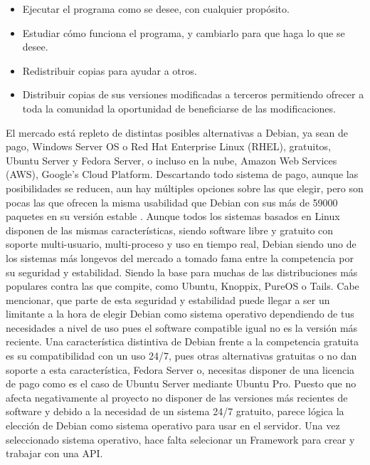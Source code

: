 \begin{itemize}
	\item Ejecutar el programa como se desee, con cualquier propósito.
	\item Estudiar cómo funciona el programa, y cambiarlo para que haga lo que se desee.
	\item Redistribuir copias para ayudar a otros.
	\item Distribuir copias de sus versiones modificadas a terceros permitiendo ofrecer a toda la comunidad la oportunidad de beneficiarse de las modificaciones.
\end{itemize}

El mercado está repleto de distintas posibles alternativas a Debian, ya sean de pago, Windows Server OS o Red Hat Enterprise Linux (RHEL), gratuitos, Ubuntu Server y Fedora Server, o incluso en la nube, Amazon Web Services (AWS), Google’s Cloud Platform. Descartando todo sistema de pago, aunque las posibilidades se reducen, aun hay múltiples opciones sobre las que elegir, pero son pocas las que ofrecen la misma usabilidad que Debian con sus más de 59000 paquetes en su versión estable \cite{DebWhy}.
\newline
\newline
Aunque todos los sistemas basados en Linux disponen de las mismas características, siendo software libre y gratuito con soporte multi-usuario, multi-proceso y uso en tiempo real, Debian siendo uno de los sistemas más longevos del mercado a tomado fama entre la competencia por su seguridad y estabilidad. Siendo la base para muchas de las distribuciones más populares contra las que compite, como Ubuntu, Knoppix, PureOS o Tails.
\newline
\newline
Cabe mencionar, que parte de esta seguridad y estabilidad puede llegar a ser un limitante a la hora de elegir Debian como sistema operativo dependiendo de tus necesidades a nivel de uso pues el software compatible igual no es la versión más reciente. Una característica distintiva de Debian frente a la competencia gratuita es su compatibilidad con un uso 24/7, pues otras alternativas gratuitas o no dan soporte a esta característica, Fedora Server o, necesitas disponer de una licencia de pago como es el caso de Ubuntu Server mediante Ubuntu Pro.
\newline
\newline
Puesto que no afecta negativamente al proyecto no disponer de las versiones más recientes de software y debido a la necesidad de un sistema 24/7 gratuito, parece lógica la elección de Debian como sistema operativo para usar en el servidor. Una vez seleccionado sistema operativo, hace falta selecionar un Framework para crear y trabajar con una API.

